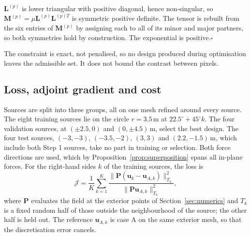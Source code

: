 \documentclass[preprint,12pt]{elsarticle}
\newcommand{\mbf}[1]{\mathbf{#1}}
\newcommand{\be}{\begin{equation}}
\newcommand{\ee}{\end{equation}}
\newcommand{\qedbox}{\hfill$\square$}
\begin{document}
\begin{pf}
$\mbf{L}^{(p)}$ is lower triangular with positive diagonal, hence non-singular, so $\mbf{M}^{(p)}=\mu\mbf{L}^{(p)}\mbf{L}^{(p)T}$ is symmetric
positive definite. The tensor is rebuilt from the six entries of $\mbf{M}^{(p)}$ by assigning each to all of its minor and major
partners, so both symmetries hold by construction. The exponential is positive.\qedbox
\end{pf}

The constraint is exact, not penalised, so no design produced during optimisation leaves the admissible set. It does not bound the
contrast between pixels.

\subsection{Loss, adjoint gradient and cost}\label{sec:s2training}

Sources are split into three groups, all on one mesh refined around every source. The eight training sources lie on the circle
$r=3.5$\,m at $22.5^\circ+45^\circ k$. The four validation sources, at $(\pm2.5,0)$ and $(0,\pm4.5)$\,m, select the best design.
The four test sources, $(-3,-3)$, $(-3.5,-2)$, $(3,3)$ and $(2.2,-1.5)$\,m, which include both Step 1 sources, take no part in
training or selection. Both force directions are used, which by Proposition~\ref{prop:superposition} spans all in-plane forces.
For the right-hand sides $k$ of the training sources, the loss is
\be\label{eq:loss}
\mathcal{J}=\frac{1}{K}\sum_{k=1}^{K}\frac{\|\mbf{P}(\mbf{u}_k-\mbf{u}_{A,k})\|^2_{T_k}}{\|\mbf{P}\mbf{u}_{A,k}\|^2_{T_k}},
\ee
where $\mbf{P}$ evaluates the field at the exterior points of Section~\ref{sec:numerics} and $T_k$ is a fixed random half of those
outside the neighbourhood of the source; the other half is held out. The reference $\mbf{u}_{A,k}$ is case A on the same exterior
mesh, so that the discretisation error cancels.
\end{document}
